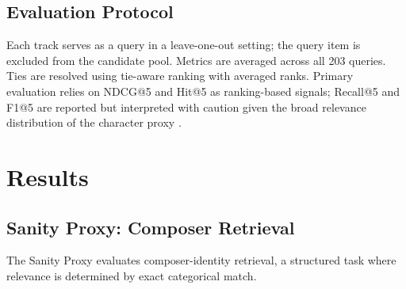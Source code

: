 \documentclass[sigconf]{acmart}
\begin{document}
\subsection{Evaluation Protocol}

Each track serves as a query in a leave-one-out setting; the query item is excluded from the candidate pool. Metrics are averaged across all 203 queries. Ties are resolved using tie-aware ranking with averaged ranks. Primary evaluation relies on NDCG@5 and Hit@5 as ranking-based signals; Recall@5 and F1@5 are reported but interpreted with caution given the broad relevance distribution of the character proxy \cite{canamares2020, urbano2013}.

\section{Results}\label{sec:results}\label{ch:results}
\subsection{Sanity Proxy: Composer Retrieval}

The Sanity Proxy evaluates composer-identity retrieval, a structured task where relevance is determined by exact categorical match.

\begin{table}[!htbp]
\centering
\caption{Sanity Proxy Results (Composer Retrieval). Metrics reported are corpus-level mean values at rank 5.}
\label{tab:sanity_results}
\end{table}
\end{document}
